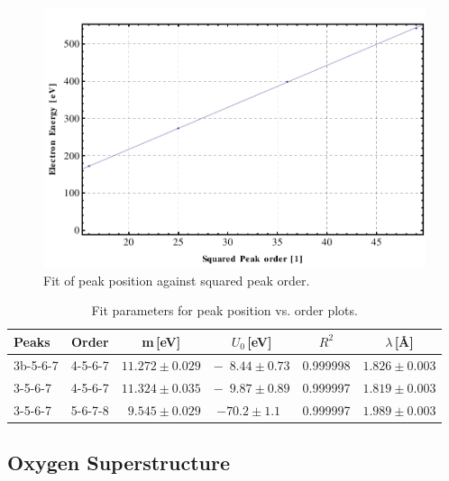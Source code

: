 \documentclass[a4paper,10pt]{scrartcl}
\begin{document}
\begin{figure}
\centering
\includegraphics[scale=0.55]{img/ivfit}
\caption{Fit of peak position against squared peak order. \label{fig:ivfit}}
\end{figure}

\begin{table}
\begin{center}
\begin{tabular}{lccccc}
\toprule
Peaks              & Order   & m\,[eV]                      & $U_{0}$\,[eV]               & $R^{2}$  & $\lambda$\,[\AA]  \\
\midrule
3b-5-6-7           & 4-5-6-7 & $11.272 \pm 0.029$           & $-\phantom{0}8.44 \pm 0.73$ & 0.999998 & $1.826 \pm 0.003$ \\
\phantom{b}3-5-6-7 & 4-5-6-7 & $11.324 \pm 0.035$           & $-\phantom{0}9.87 \pm 0.89$ & 0.999997 & $1.819 \pm 0.003$ \\
\phantom{b}3-5-6-7 & 5-6-7-8 & $\phantom{0}9.545 \pm 0.029$ & $-70.2 \pm 1.1\phantom{0}$  & 0.999997 & $1.989 \pm 0.003$ \\
\bottomrule
\end{tabular}
\end{center}
\par
\caption{Fit parameters for peak position vs. order plots. \label{tab:ivfitparas}}
\end{table}


\subsection{Oxygen Superstructure}
\end{document}

